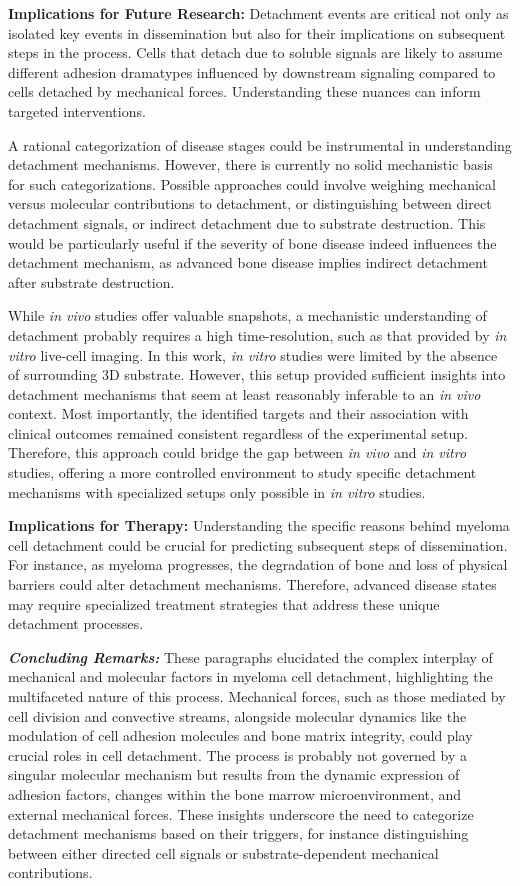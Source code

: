 \textbf{Implications for Future Research:}%
Detachment events are critical not only as isolated key events in dissemination
but also for their implications on subsequent steps in the process. Cells that
detach due to soluble signals are likely to assume different adhesion dramatypes
influenced by downstream signaling compared to cells detached by mechanical
forces. Understanding these nuances can inform targeted interventions.

A rational categorization of disease stages could be instrumental in
understanding detachment mechanisms. However, there is currently no solid
mechanistic basis for such categorizations. Possible approaches could involve
weighing mechanical versus molecular contributions to detachment, or
distinguishing between direct detachment signals, or indirect detachment due to
substrate destruction. This would be particularly useful if the severity of bone
disease indeed influences the detachment mechanism, as advanced bone disease
implies indirect detachment after substrate destruction.

While \textit{in vivo} studies offer valuable snapshots, a mechanistic
understanding of detachment probably requires a high time-resolution, such as
that provided by \textit{in vitro} live-cell imaging. In this work, \textit{in
      vitro} studies were limited by the absence of surrounding 3D substrate. However,
this setup provided sufficient insights into detachment mechanisms that seem at
least reasonably inferable to an \textit{in vivo} context. Most importantly, the
identified targets and their association with clinical outcomes remained
consistent regardless of the experimental setup. Therefore, this approach could
bridge the gap between \textit{in vivo} and \textit{in vitro} studies, offering
a more controlled environment to study specific detachment mechanisms with
specialized setups only possible in \textit{in vitro} studies.


\textbf{Implications for Therapy:}%
Understanding the specific reasons behind myeloma cell detachment could be
crucial for predicting subsequent steps of dissemination. For instance, as
myeloma progresses, the degradation of bone and loss of physical barriers could
alter detachment mechanisms. Therefore, advanced disease states may require
specialized treatment strategies that address these unique detachment processes.


\textbf{\textit{Concluding Remarks:}}%
These paragraphs elucidated the complex interplay of mechanical and molecular
factors in myeloma cell detachment, highlighting the multifaceted nature of this
process. Mechanical forces, such as those mediated by cell division and
convective streams, alongside molecular dynamics like the modulation of cell
adhesion molecules and bone matrix integrity, could play crucial roles in cell
detachment. The process is probably not governed by a singular molecular
mechanism but results from the dynamic expression of adhesion factors, changes
within the bone marrow microenvironment, and external mechanical forces. These
insights underscore the need to categorize detachment mechanisms based on their
triggers, for instance distinguishing between either directed cell signals or
substrate-dependent mechanical contributions.

